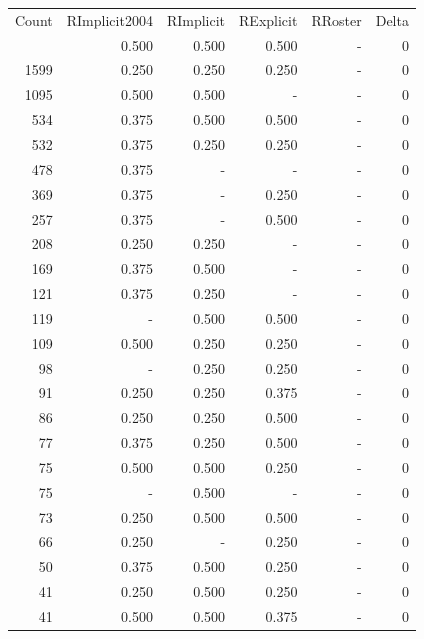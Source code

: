 \documentclass[a4paper]{article}\usepackage[]{graphicx}\usepackage[]{color}
\begin{document}
\begin{table}[ht]
\centering
\begin{tabular}{rrrrrr}
  \hline
Count & RImplicit2004 & RImplicit & RExplicit & RRoster & Delta \\ 
  \rowcolor{goodColor}  \hline
4406 & 0.500 & 0.500 & 0.500 & - & 0 \\ 
   \rowcolor{goodColor} 1599 & 0.250 & 0.250 & 0.250 & - & 0 \\ 
  1095 & 0.500 & 0.500 & - & - & 0 \\ 
   \rowcolor{goodColor} 534 & 0.375 & 0.500 & 0.500 & - & 0 \\ 
   \rowcolor{goodColor} 532 & 0.375 & 0.250 & 0.250 & - & 0 \\ 
   \rowcolor{nullColor} 478 & 0.375 & - & - & - & 0 \\ 
   \rowcolor{sosoColor} 369 & 0.375 & - & 0.250 & - & 0 \\ 
   \rowcolor{sosoColor} 257 & 0.375 & - & 0.500 & - & 0 \\ 
  208 & 0.250 & 0.250 & - & - & 0 \\ 
  169 & 0.375 & 0.500 & - & - & 0 \\ 
  121 & 0.375 & 0.250 & - & - & 0 \\ 
   \rowcolor{goodColor} 119 & - & 0.500 & 0.500 & - & 0 \\ 
   \rowcolor{goodColor} 109 & 0.500 & 0.250 & 0.250 & - & 0 \\ 
   \rowcolor{goodColor} 98 & - & 0.250 & 0.250 & - & 0 \\ 
  91 & 0.250 & 0.250 & 0.375 & - & 0 \\ 
   \rowcolor{badColor} 86 & 0.250 & 0.250 & 0.500 & - & 0 \\ 
   \rowcolor{badColor} 77 & 0.375 & 0.250 & 0.500 & - & 0 \\ 
   \rowcolor{badColor} 75 & 0.500 & 0.500 & 0.250 & - & 0 \\ 
  75 & - & 0.500 & - & - & 0 \\ 
   \rowcolor{goodColor} 73 & 0.250 & 0.500 & 0.500 & - & 0 \\ 
   \rowcolor{sosoColor} 66 & 0.250 & - & 0.250 & - & 0 \\ 
   \rowcolor{badColor} 50 & 0.375 & 0.500 & 0.250 & - & 0 \\ 
   \rowcolor{badColor} 41 & 0.250 & 0.500 & 0.250 & - & 0 \\ 
  41 & 0.500 & 0.500 & 0.375 & - & 0 \\ 

\end{tabular}
\end{table}
\end{document}
